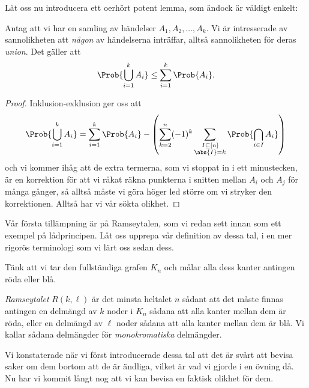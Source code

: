 \documentclass[nobib]{tufte-handout}
\begin{document}
Låt oss nu introducera ett oerhört potent lemma, som ändock är väldigt enkelt:

\begin{lemma}[Unionsbegränsning]\label{union_bound}
    Antag att vi har en samling av händelser $A_1, A_2, \ldots, A_k$. Vi är intresserade av sannolikheten att \emph{någon} av händelserna inträffar, alltså sannolikheten för deras \emph{union}. Det gäller att
    $$\Prob{\bigcup_{i=1}^k A_i} \leq \sum_{i=1}^{k} \Prob{A_i}.$$

    \begin{proof}
        Inklusion-exklusion ger oss att
        $$\Prob{\bigcup_{i=1}^k A_i} = \sum_{i=1}^{k} \Prob{A_i} - \left(\sum_{k=2}^{n} (-1)^{k}\sum_{\substack{I \subseteq [n]\\\abs{I} = k}} \Prob{\bigcap_{i\in I} A_i}\right)$$
        och vi kommer ihåg att de extra termerna, som vi stoppat in i ett minustecken, är en korrektion för att vi råkat räkna punkterna i snitten mellan $A_i$ och $A_j$ för många gånger, så alltså måste vi göra höger led större om vi stryker den korrektionen. Alltså har vi vår sökta olikhet.
    \end{proof}
\end{lemma}

Vår första tillämpning är på Ramseytalen, som vi redan sett innan som ett exempel på lådprincipen. Låt oss upprepa vår definition av dessa tal, i en mer rigorös terminologi som vi lärt oss sedan dess.

\begin{definition}
    Tänk att vi tar den fullständiga grafen $K_n$ och målar alla dess kanter antingen röda eller blå.

    \emph{Ramseytalet} $R(k,\ell)$ är det minsta heltalet $n$ sådant att det måste finnas antingen en delmängd av $k$ noder i $K_n$ sådana att alla kanter mellan dem är röda, eller en delmängd av $\ell$ noder sådana att alla kanter mellan dem är blå. Vi kallar sådana delmängder för \emph{monokromatiska} delmängder.
\end{definition}

Vi konstaterade när vi först introducerade dessa tal att det är svårt att bevisa saker om dem bortom att de är ändliga, vilket är vad vi gjorde i en övning då. Nu har vi kommit långt nog att vi kan bevisa en faktisk olikhet för dem.
\end{document}
